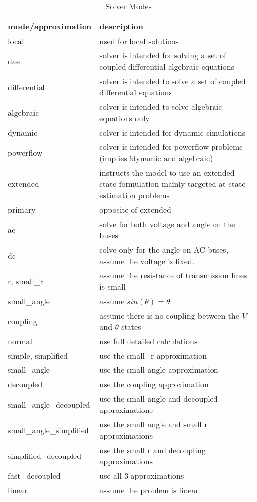 \documentclass[12pt]{article} %
\begin{document}
   \begin{table}[ht]

       \caption{Solver Modes} %
       \centering %
       \begin{tabular}{l p{10cm}} %
           \hline %
           mode/approximation & description \\ [0.5ex] %
           \hline %
           local & used for local solutions \\
           dae  & solver is intended for solving a set of coupled differential-algebraic equations \\
           differential & solver is intended to solve a set of coupled differential equations \\
           algebraic & solver is intended to solve algebraic equations only \\
           dynamic & solver is intended for dynamic simulations \\
           powerflow & solver is intended for powerflow problems (implies !dynamic and algebraic) \\
           extended & instructs the model to use an extended state formulation mainly targeted at state estimation problems \\
           primary & opposite of extended \\
           ac & solve for both voltage and angle on the buses \\
           dc & solve only for the angle on AC buses, assume the voltage is fixed.   \\
           r, small\_r & assume the resistance of transmission lines is small \\
           small\_angle &  assume $sin(\theta)=\theta$  \\
           coupling & assume there is no coupling between the $V$ and $\theta$ states \\
           normal & use full detailed calculations \\
           simple, simplified & use the small\_r approximation \\
           small\_angle & use the small angle approximation \\
           decoupled & use the coupling approximation \\
           small\_angle\_decoupled & use the small angle and decoupled approximations \\
           small\_angle\_simplified & use the small angle and small r approximations \\
           simplified\_decoupled & use the small r and decoupling approximations \\
           fast\_decoupled & use all 3 approximations \\
           linear & assume the problem is linear \\


           \hline %
       \end{tabular}
       \label{table:approxmodes}
   \end{table}
\end{document}
